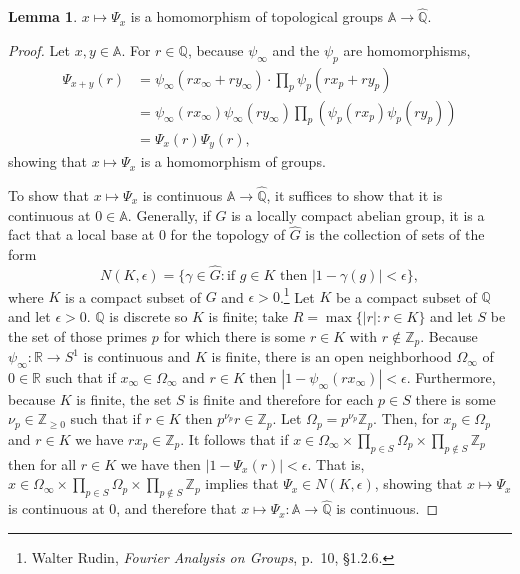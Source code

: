 \documentclass{article}
\theoremstyle{definition}
\newtheorem{lemma}[theorem]{Lemma}
\theoremstyle{definition}
\begin{document}
\begin{lemma}
$x \mapsto \Psi_x$ is a homomorphism of topological groups $\mathbb{A} \to \widehat{\mathbb{Q}}$.
\end{lemma}
\begin{proof}
Let $x,y \in \mathbb{A}$. For $r \in \mathbb{Q}$, because $\psi_\infty$ and the $\psi_p$ are homomorphisms,
\begin{align*}
\Psi_{x+y}(r) &=  \psi_\infty(rx_\infty+ry_\infty) \cdot \prod_p \psi_p(rx_p+ry_p)\\
&=\psi_\infty(rx_\infty) \psi_\infty(ry_\infty) \prod_p (\psi_p(rx_p) \psi_p(ry_p))\\
&=\Psi_x(r) \Psi_y(r),
\end{align*}
showing that $x \mapsto \Psi_x$ is a homomorphism of groups.

To show  that $x \mapsto \Psi_x$ is continuous $\mathbb{A} \to \widehat{\mathbb{Q}}$, it suffices to show that
it is continuous at $0 \in \mathbb{A}$. Generally, if $G$ is a locally compact abelian group, it is a fact that a local base at $0$ for
the topology of $\widehat{G}$ is the collection of sets of the form
\[
N(K,\epsilon) = \{\gamma \in \widehat{G}: \textrm{if $g \in K$ then $|1-\gamma(g)|<\epsilon$}\},
\]
where $K$ is a compact subset of $G$ and $\epsilon>0$.\footnote{Walter Rudin, {\em Fourier Analysis on Groups}, p.~10, \S 1.2.6.}
Let $K$ be a compact subset of $\mathbb{Q}$ and let $\epsilon>0$. $\mathbb{Q}$ is discrete so $K$ is finite; take $R=\max\{|r|:r \in K\}$ and let
$S$ be the set of those primes $p$ for which there is some $r \in K$ with $r \not \in \mathbb{Z}_p$.
Because $\psi_\infty:\mathbb{R} \to S^1$ is continuous and $K$ is finite, there is an open neighborhood $\Omega_\infty$ of $0 \in \mathbb{R}$ such that if
$x_\infty \in \Omega_\infty$
and $r \in K$ then $|1-\psi_\infty(rx_\infty)|<\epsilon$. Furthermore,
because $K$ is finite, the set $S$ is finite
and therefore for each $p \in S$ there is some $\nu_p \in \mathbb{Z}_{\geq 0}$ such that if $r \in K$ then $p^{\nu_p} r \in \mathbb{Z}_p$.
Let $\Omega_p = p^{\nu_p} \mathbb{Z}_p$. Then, for $x_p \in \Omega_p$ and $r \in K$ we have $rx_p \in \mathbb{Z}_p$. 
It follows that if 
$x \in \Omega_\infty \times \prod_{p \in S} \Omega_p \times \prod_{p \not \in S} \mathbb{Z}_p$ then
for all $r \in K$ we have 
then $|1-\Psi_x(r)|<\epsilon$. That is,
$x \in \Omega_\infty \times \prod_{p \in S} \Omega_p \times \prod_{p \not \in S} \mathbb{Z}_p$ implies that $\Psi_x \in N(K,\epsilon)$,
showing that $x \mapsto \Psi_x$ is continuous at $0$, and therefore that $x \mapsto \Psi_x:\mathbb{A} \to \widehat{\mathbb{Q}}$ is continuous.
\end{proof}
\end{document}
